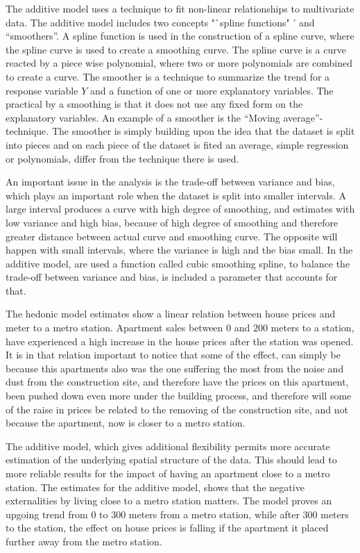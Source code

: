 The additive model uses a technique to fit non-linear relationships to 
multivariate data. The additive model includes two concepts "`spline functions"
' and "`smoothers"'.  A spline function is used in the construction of a 
spline curve, where the spline curve is used to create a smoothing curve.  
The spline curve is a curve reacted by a piece wise polynomial, where two or 
more polynomials are combined to create a curve. The smoother is a technique to
summarize the trend for a response variable $Y$ and a function of one or more 
explanatory variables. The practical by a smoothing is that it does not use 
any fixed form on the explanatory variables.  An example of a smoother is the 
"`Moving average"'-technique. The smoother is simply building upon the idea 
that the dataset is split into pieces and on each piece of the dataset is 
fited an average, simple regression or polynomials, differ from the technique
there is used.

An important issue in the analysis is the trade-off between variance and 
bias, which plays an important role when the dataset is split into smaller 
intervals. A large interval produces a curve with high degree of smoothing, 
and 
estimates with low variance and high bias, because of high degree of 
smoothing and therefore greater distance between actual curve and smoothing 
curve.  The opposite will happen with small intervals, where the variance is 
high and the bias small.  In the additive model, are used a function called 
cubic smoothing spline, to balance the trade-off between variance and 
bias, is included a parameter that accounts for that. 





The hedonic model estimates show a linear relation between house prices and 
meter to a metro station. Apartment sales between $0$ and $200$ meters to a 
station, have experienced a high increase in the house prices after the 
station was opened. It is in that relation important to notice that some of 
the 
effect, can simply be because this apartments also was the one suffering the 
most from the noise and dust from the construction site, and therefore have
the prices on this apartment, been pushed down even more under the building 
process, and therefore will some of the raise in prices be related to the 
removing of the construction site, and not because the apartment, now is 
closer to a metro station.

The additive model, which gives additional flexibility permits more accurate 
estimation of the underlying spatial structure of the data. This should lead 
to more reliable results for the impact of having an apartment close to a 
metro station.
The estimates for the additive model, shows that the negative externalities by 
living close to a metro station matters. The model proves an upgoing trend 
from $0$
to $300$ meters from a metro station, while after $300$ meters to the station, 
the effect on house prices is falling if the apartment it placed further away 
from the metro station.   

